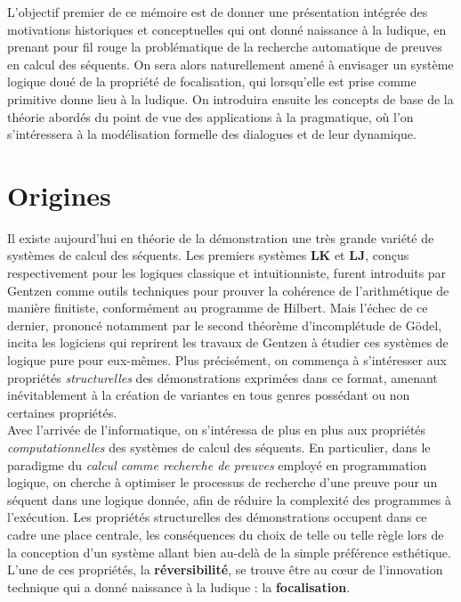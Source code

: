 \documentclass[12pt]{report}
\begin{document}
L'objectif premier de ce mémoire est de donner une présentation intégrée des motivations historiques et conceptuelles qui ont donné naissance à la ludique, en prenant pour fil rouge la problématique de la recherche automatique de preuves en calcul des séquents. On sera alors naturellement amené à envisager un système logique doué de la propriété de focalisation, qui lorsqu'elle est prise comme primitive donne lieu à la ludique. On introduira ensuite les concepts de base de la théorie abordés du point de vue des applications à la pragmatique, où l'on s'intéressera à la modélisation formelle des dialogues et de leur dynamique.

\chapter*{Origines}

Il existe aujourd'hui en théorie de la démonstration une très grande variété de systèmes de calcul des séquents. Les premiers systèmes $\mathbf{LK}$ et $\mathbf{LJ}$, conçus respectivement pour les logiques classique et intuitionniste, furent introduits par Gentzen comme outils techniques pour prouver la cohérence de l'arithmétique de manière finitiste, conformément au programme de Hilbert. Mais l'échec de ce dernier, prononcé notamment par le second théorème d'incomplétude de Gödel, incita les logiciens qui reprirent les travaux de Gentzen à étudier ces systèmes de logique pure pour eux-mêmes. Plus précisément, on commença à s'intéresser aux propriétés \emph{structurelles} des démonstrations exprimées dans ce format, amenant inévitablement à la création de variantes en tous genres possédant ou non certaines propriétés.\\

Avec l'arrivée de l'informatique, on s'intéressa de plus en plus aux propriétés \emph{computationnelles} des systèmes de calcul des séquents. En particulier, dans le paradigme du \emph{calcul comme recherche de preuves} employé en programmation logique, on cherche à optimiser le processus de recherche d'une preuve pour un séquent dans une logique donnée, afin de réduire la complexité des programmes à l'exécution. Les propriétés structurelles des démonstrations occupent dans ce cadre une place centrale, les conséquences du choix de telle ou telle règle lors de la conception d'un système allant bien au-delà de la simple préférence esthétique. L'une de ces propriétés, la \textbf{réversibilité}, se trouve être au c\oe{}ur de l'innovation technique qui a donné naissance à la ludique : la \textbf{focalisation}.
\end{document}
